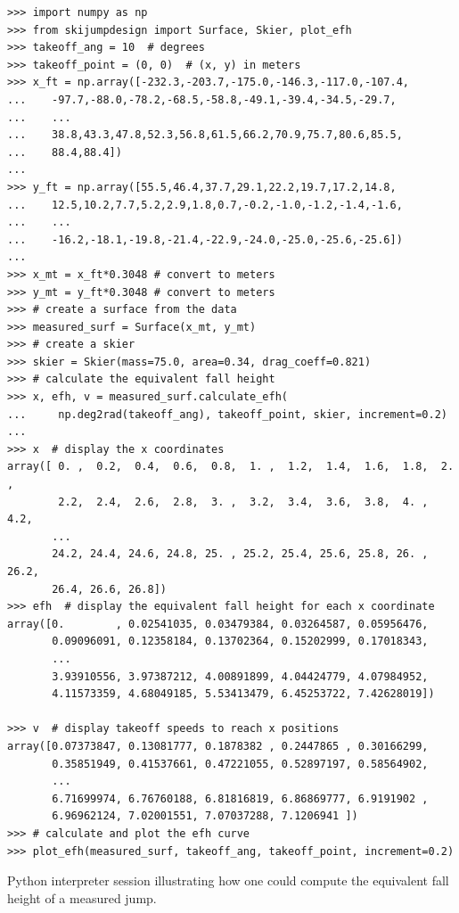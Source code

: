 \documentclass[smallextended]{svjour3}       %
\begin{document}
\begin{listing*}
  \begin{verbatim}
>>> import numpy as np
>>> from skijumpdesign import Surface, Skier, plot_efh
>>> takeoff_ang = 10  # degrees
>>> takeoff_point = (0, 0)  # (x, y) in meters
>>> x_ft = np.array([-232.3,-203.7,-175.0,-146.3,-117.0,-107.4,
...    -97.7,-88.0,-78.2,-68.5,-58.8,-49.1,-39.4,-34.5,-29.7,
...    ...
...    38.8,43.3,47.8,52.3,56.8,61.5,66.2,70.9,75.7,80.6,85.5,
...    88.4,88.4])
...
>>> y_ft = np.array([55.5,46.4,37.7,29.1,22.2,19.7,17.2,14.8,
...    12.5,10.2,7.7,5.2,2.9,1.8,0.7,-0.2,-1.0,-1.2,-1.4,-1.6,
...    ...
...    -16.2,-18.1,-19.8,-21.4,-22.9,-24.0,-25.0,-25.6,-25.6])
...
>>> x_mt = x_ft*0.3048 # convert to meters
>>> y_mt = y_ft*0.3048 # convert to meters
>>> # create a surface from the data
>>> measured_surf = Surface(x_mt, y_mt)
>>> # create a skier
>>> skier = Skier(mass=75.0, area=0.34, drag_coeff=0.821)
>>> # calculate the equivalent fall height
>>> x, efh, v = measured_surf.calculate_efh(
...     np.deg2rad(takeoff_ang), takeoff_point, skier, increment=0.2)
...
>>> x  # display the x coordinates
array([ 0. ,  0.2,  0.4,  0.6,  0.8,  1. ,  1.2,  1.4,  1.6,  1.8,  2. ,
        2.2,  2.4,  2.6,  2.8,  3. ,  3.2,  3.4,  3.6,  3.8,  4. ,  4.2,
       ...
       24.2, 24.4, 24.6, 24.8, 25. , 25.2, 25.4, 25.6, 25.8, 26. , 26.2,
       26.4, 26.6, 26.8])
>>> efh  # display the equivalent fall height for each x coordinate
array([0.        , 0.02541035, 0.03479384, 0.03264587, 0.05956476,
       0.09096091, 0.12358184, 0.13702364, 0.15202999, 0.17018343,
       ...
       3.93910556, 3.97387212, 4.00891899, 4.04424779, 4.07984952,
       4.11573359, 4.68049185, 5.53413479, 6.45253722, 7.42628019])

>>> v  # display takeoff speeds to reach x positions
array([0.07373847, 0.13081777, 0.1878382 , 0.2447865 , 0.30166299,
       0.35851949, 0.41537661, 0.47221055, 0.52897197, 0.58564902,
       ...
       6.71699974, 6.76760188, 6.81816819, 6.86869777, 6.9191902 ,
       6.96962124, 7.02001551, 7.07037288, 7.1206941 ])
>>> # calculate and plot the efh curve
>>> plot_efh(measured_surf, takeoff_ang, takeoff_point, increment=0.2)
  \end{verbatim}
  \caption{Python interpreter session illustrating how one could compute the
  equivalent fall height of a measured jump.}
  \label{lis:example-efh-calc}
\end{listing*}
\end{document}
